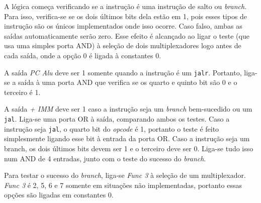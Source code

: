 \documentclass[twocolumn]{article}
\begin{document}
A lógica começa verificando se a instrução é uma instrução de salto ou
\textit{branch}. Para isso, verifica-se se os dois últimos bits dela estão em 1,
pois esses tipos de instrução são os únicos implementados onde isso
ocorre\cite{spec}. Caso falso, ambas as saídas automaticamente serão zero. Esse
efeito é alcançado ao ligar o teste (que usa uma simples porta AND) à seleção de
dois multiplexadores logo antes de cada saída, onde a opção 0 é ligada à
constantes 0.

A saída \textit{PC Alu} deve ser 1 somente quando a instrução é um
\verb|jalr|. Portanto, liga-se a saída à uma porta AND que verifica se os quarto
e quinto bit são 0 e o terceiro é 1.

A saída \textit{+ IMM} deve ser 1 caso a instrução seja um \textit{branch}
bem-sucedido ou um \verb|jal|. Liga-se uma porta OR à saída, comparando ambos os
testes. Caso a instrução seja \verb|jal|, o quarto bit do \textit{opcode} é 1,
portanto o teste é feito simplesmente ligando esse bit à entrada da porta
OR. Caso a instrução seja um branch, os dois últimos bits devem ser 1 e o
terceiro deve ser 0. Liga-se tudo isso num AND de 4 entradas, junto com o teste
do sucesso do \textit{branch}.

Para testar o sucesso do \textit{branch}, liga-se \textit{Func 3} à seleção de
um multiplexador. \textit{Func 3} é 2, 5, 6 e 7 somente em situações não
implementadas, portanto essas opções são ligadas em constantes 0.

{}

\end{document}
